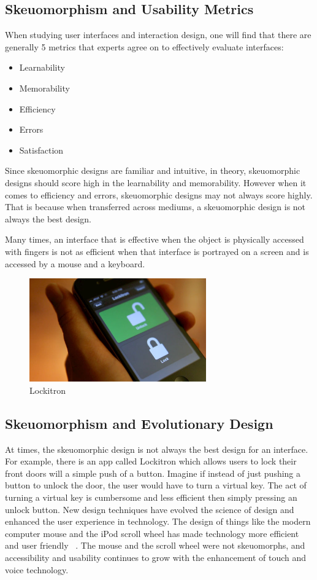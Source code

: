 \documentclass{article}
\begin{document}
\subsection{Skeuomorphism and Usability Metrics}
	When studying user interfaces and interaction design, one will find that there are generally 5 metrics that experts agree on to effectively evaluate interfaces: 
\begin{itemize}
\item Learnability 
\item Memorability 
\item Efficiency 
\item Errors 
\item Satisfaction 
\end{itemize}

	Since skeuomorphic designs are familiar and intuitive, in theory, skeuomorphic designs should score high in the learnability and memorability. However when it comes to efficiency and errors, skeuomorphic designs may not always score highly. That is because when transferred across mediums, a skeuomorphic design is not always the best design. 
	\begin{emph}Many times, an interface that is effective when the object is physically accessed with fingers is not as efficient when that interface is portrayed on a screen and is accessed by a mouse and a keyboard. 
	\end{emph}
	\begin{figure}
\centering
\includegraphics[width=3in]{lockitron.jpeg} 

\caption{Lockitron}
\label{Lockitron Smartphone App}
\end{figure}
\subsection{Skeuomorphism and Evolutionary Design}

At times, the skeuomorphic design is not always the best design for an interface. For example, there is an app called Lockitron which allows users to lock their front doors will a simple push of a button. Imagine if instead of just pushing a button to unlock the door, the user would have to turn a virtual key. The act of turning a virtual key is cumbersome and less efficient then simply pressing an unlock button. New design techniques have evolved the science of design and enhanced the user experience in technology. The design of things like the modern computer mouse and the iPod scroll wheel has made technology more efficient and user friendly ~\cite{ipod}. The mouse and the scroll wheel were not skeuomorphs, and accessibility and usability continues to grow with the enhancement of touch and voice technology. 
\end{document}
